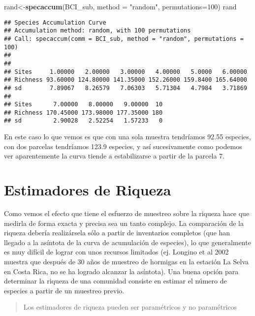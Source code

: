 \documentclass[]{book}
\newenvironment{Shaded}{\begin{snugshade}}{\end{snugshade}}
\newcommand{\KeywordTok}[1]{\textcolor[rgb]{0.13,0.29,0.53}{\textbf{{#1}}}}
\newcommand{\DataTypeTok}[1]{\textcolor[rgb]{0.13,0.29,0.53}{{#1}}}
\newcommand{\DecValTok}[1]{\textcolor[rgb]{0.00,0.00,0.81}{{#1}}}
\newcommand{\StringTok}[1]{\textcolor[rgb]{0.31,0.60,0.02}{{#1}}}
\newcommand{\NormalTok}[1]{{#1}}
\begin{document}
\begin{Shaded}
\begin{Highlighting}[]
\NormalTok{rand<-}\KeywordTok{specaccum}\NormalTok{(BCI_sub, }\DataTypeTok{method =} \StringTok{"random"}\NormalTok{, }\DataTypeTok{permutations=}\DecValTok{100}\NormalTok{)}
\NormalTok{rand}
\end{Highlighting}
\end{Shaded}

\begin{verbatim}
## Species Accumulation Curve
## Accumulation method: random, with 100 permutations
## Call: specaccum(comm = BCI_sub, method = "random", permutations = 100) 
## 
##                                                                   
## Sites     1.00000   2.00000   3.00000   4.00000   5.0000   6.00000
## Richness 93.60000 124.80000 141.35000 152.26000 159.8400 165.64000
## sd        7.89067   8.26579   7.06303   5.71304   4.7984   3.71869
##                                           
## Sites      7.00000   8.00000   9.00000  10
## Richness 170.45000 173.98000 177.35000 180
## sd         2.90028   2.52254   1.57233   0
\end{verbatim}

En este caso lo que vemos es que con una sola muestra tendríamos 92.55
especies, con dos parcelas tendríamos 123.9 especies, y así
sucesivamente como podemos ver aparentemente la curva tiende a
estabilizarse a partir de la parcela 7.

\section{Estimadores de Riqueza}\label{estimadores-de-riqueza}

Como vemos el efecto que tiene el esfuerzo de muestreo sobre la riqueza
hace que medirla de forma exacta y precisa sea un tanto complejo. La
comparación de la riqueza debería realizársela sólo a partir de
inventarios completos (que han llegado a la asíntota de la curva de
acumulación de especies), lo que generalmente es muy difícil de lograr
con unos recursos limitados (ej. Longino et al 2002 muestra que después
de 30 años de muestreo de hormigas en la estación La Selva en Costa
Rica, no se ha logrado alcanzar la asíntota). Una buena opción para
determinar la riqueza de una comunidad consiste en estimar el número de
especies a partir de un muestreo previo.

\begin{quote}
Los estimadores de riqueza pueden ser paramétricos y no paramétricos
\end{quote}
\end{document}
